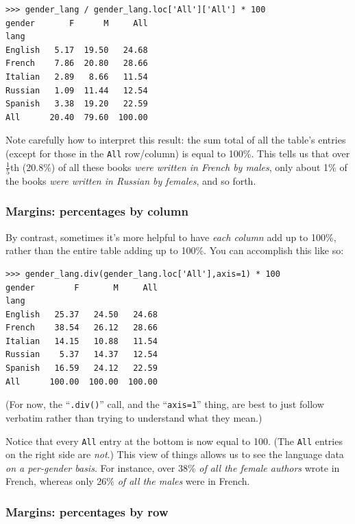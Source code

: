 \begin{Verbatim}[fontsize=\scriptsize,samepage=true,frame=single]
>>> gender_lang / gender_lang.loc['All']['All'] * 100
gender       F      M     All
lang                         
English   5.17  19.50   24.68
French    7.86  20.80   28.66
Italian   2.89   8.66   11.54
Russian   1.09  11.44   12.54
Spanish   3.38  19.20   22.59
All      20.40  79.60  100.00
\end{Verbatim}

Note carefully how to interpret this result: the sum total of all the table's
entries (except for those in the \texttt{All} row/column) is equal to 100\%.
This tells us that over $\frac{1}{5}$th (20.8\%) of all these books
\textit{were written in French by males}, only about 1\% of the books
\textit{were written in Russian by females}, and so forth.

\subsubsection{Margins: percentages by column}

By contrast, sometimes it's more helpful to have \textit{each column} add up to
100\%, rather than the entire table adding up to 100\%. You can accomplish this
like so:

\begin{Verbatim}[fontsize=\scriptsize,samepage=true,frame=single]
>>> gender_lang.div(gender_lang.loc['All'],axis=1) * 100
gender        F       M     All
lang                           
English   25.37   24.50   24.68
French    38.54   26.12   28.66
Italian   14.15   10.88   11.54
Russian    5.37   14.37   12.54
Spanish   16.59   24.12   22.59
All      100.00  100.00  100.00
\end{Verbatim}

(For now, the ``\texttt{.div()}'' call, and the ``\texttt{axis=1}'' thing, are
best to just follow verbatim rather than trying to understand what they mean.)

Notice that every \texttt{All} entry at the bottom is now equal to 100.
(The \texttt{All} entries on the right side are \textit{not}.) This view of
things allows us to see the language data \textit{on a per-gender basis}. For
instance, over 38\% \textit{of all the female authors} wrote in French, whereas
only 26\% \textit{of all the males} were in French.

\subsubsection{Margins: percentages by row}

